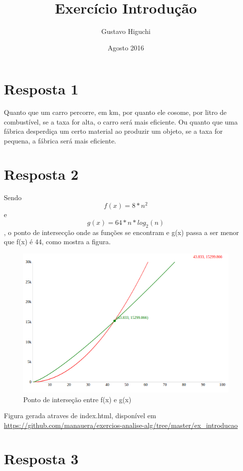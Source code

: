 \documentclass{article}
\title{Exercício Introdução}
\author{Gustavo Higuchi}
\date{Agosto 2016}
\begin{document}
\maketitle
\section{Resposta 1 }
Quanto que um carro percorre, em km, por quanto ele cosome, por litro de combustível, se a taxa for alta, o carro será mais eficiente.
Ou quanto que uma fábrica desperdiça um certo material ao produzir um objeto, se a taxa for pequena, a fábrica será mais eficiente.

\section{Resposta 2}

Sendo \[f(x)=8*n^2\] e \[g(x)=64*n*log_2(n)\], o ponto de intersecção onde as funções se encontram
e g(x) passa a ser menor que f(x) é 44, como mostra a figura.

\begin{figure}[h!]
\centering
\includegraphics[scale=0.4]{ex_02.png}
\caption{Ponto de interseção entre f(x) e g(x)}
\label{fig:univerise}
\end{figure}

Figura gerada atraves de index.html, disponível em \url{https://github.com/manauera/exercios-analise-alg/tree/master/ex_introducao} 

\section{Resposta 3}
\end{document}
